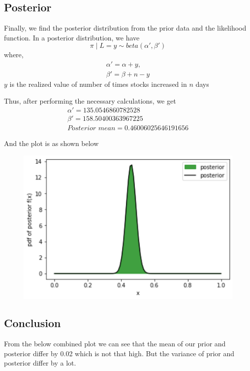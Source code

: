 \documentclass[conference]{IEEEtran}
\begin{document}
    
    \subsection{Posterior}
        Finally, we find the posterior distribution from the prior data and the likelihood function. In a posterior distribution, we have 
        \[
            \pi \mid L = y \sim beta(\alpha', \beta')
        \] 
        where, 
        \begin{gather*}
            \alpha' = \alpha + y, \\
            \beta' =  \beta + n - y  
        \end{gather*}
        $y$ is the realized value of number of times stocks increased in $n$ days
        
        
        Thus, after performing the necessary calculations, we get 
        \begin{gather*}
            \alpha' = 135.0546860782528\\
            \beta' = 158.50400363967225\\
            \textit{Posterior mean} = 0.46006025646191656   
        \end{gather*}
    
        And the plot is as shown below
        \begin{figure}[htbp]
        \centering
          \centerline{\includegraphics[scale=1]{Images/Posterior_Dist.png}}
        \end{figure}  
        
    \newpage
    \subsection{Conclusion}
        From the below combined plot we can see that the mean of our prior and posterior differ by 0.02 which is not that high. But the variance of prior and posterior differ by a lot.
\end{document}
